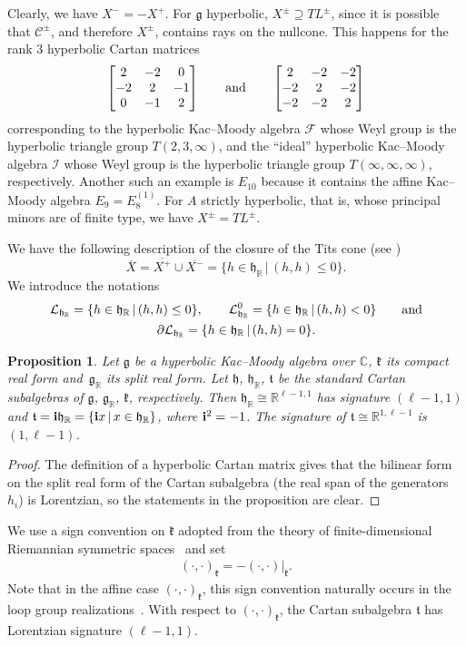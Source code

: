\documentclass[pdftex]{sigma}
\numberwithin{equation}{section}
\newtheorem{Proposition}[Theorem]{Proposition}
 { \theoremstyle{definition}
\newtheorem{Definition}[Theorem]{Definition}
\newtheorem{Remark}[Theorem]{Remark} }
\def\C{{\mathbb C}}
\def\R{\mathbb{R}}
\def\bi{{\bf i}}
\def\cC{\mathcal C}
\def\cF{\mathcal F}
\def\cI{\mathcal I}
\def\cL{\mathcal L}
\def\g{\mathfrak{g}}
\def\h{\mathfrak{h}}
\def\k{\mathfrak{k}}
\def\ft{\mathfrak{t}}
\begin{document}
Clearly, we have $X^- = - X^+$. For $\g$ hyperbolic, $X^\pm \supseteq TL^\pm$, since it is possible that $\cC^\pm$, and therefore $X^\pm$, contains rays on the nullcone. This happens for the rank $3$ hyperbolic Cartan matrices
\[\bmatrix 2&-2&0 \\ -2&2&-1 \\ 0&-1&2 \endbmatrix \qquad\hbox{and}\qquad \bmatrix 2&-2&-2 \\ -2&2&-2 \\ -2&-2&2 \endbmatrix\]
corresponding to the hyperbolic Kac--Moody algebra $\cF$ \cite{FeingoldFrenkel83} whose Weyl group is the hyperbolic triangle group
$T(2,3,\infty)$, and the ``ideal'' hyperbolic Kac--Moody algebra $\cI$ whose Weyl group is the hyperbolic triangle group
$T(\infty,\infty,\infty)$, respectively.
Another such an example is $E_{10}$ because it contains the affine Kac--Moody algebra $E_{9} = E_8^{(1)}$.
For $A$ strictly hyperbolic, that is, whose principal minors are of finite type, we have $X^\pm = TL^\pm$.

We have the following description of the closure of the Tits cone (see \cite[equation~(5.10.2)]{Kac90})
\[\overline{X} = \overline{X^+}\cup \overline{X^-} = \{h\in \h_{\R}\,|\, (h, h)\leq 0\}.\]
We introduce the notations
\begin{gather*}
\cL_{\h_{\R}}=\{h\in \h_{\R}\,|\, (h, h)\leq 0\},\qquad
\cL_{\h_{\R}}^0=\{h\in \h_{\R}\,|\, (h, h)< 0\}\qquad \hbox{and}\\
\partial\cL_{\h_{\R}}=\{h\in \h_{\R}\,|\, (h, h)= 0\}.
\end{gather*}

\begin{Proposition} Let $\g$ be a hyperbolic Kac--Moody algebra over $\C$, $\k$ its compact real form and~$\g_\R$ its split real form. Let $\h$, $\h_\R$, $\ft$ be the standard Cartan subalgebras of $\g$, $\g_\R$, $\k$, respectively. Then $\h_{\R}\cong \R^{\ell-1,1}$ has signature $(\ell-1,1)$ and
$\ft= {\bi}\h_{\R} = \{{\bi}x\,|\, x\in \h_{\R}\}$, where ${\bi}^2=-1$. The signature of $\ft \cong \R^{1,\ell-1}$ is $(1,\ell-1)$.
\end{Proposition}
\begin{proof} The definition of a hyperbolic Cartan matrix gives that the bilinear form on the split real form of the Cartan subalgebra (the real span of the generators~$h_i$) is Lorentzian, so the statements in the proposition are clear.
\end{proof}

We use a sign convention on $\k$ adopted from the theory of finite-dimensional Riemannian symmetric spaces~\cite{Helgason01} and set
\begin{gather}\label{equation:compactmetric}
(\cdot,\cdot)_{\k} = - (\cdot,\cdot)|_{\k}.
\end{gather}
Note that in the affine case $(\cdot,\cdot)_{\k}$, this sign convention naturally occurs in the loop group realizations~\cite{Freyn09, PressleySegal86}. With respect to $(\cdot,\cdot)_{\k}$, the Cartan subalgebra $\ft$ has Lorentzian signature $(\ell-1,1)$.
\end{document}
